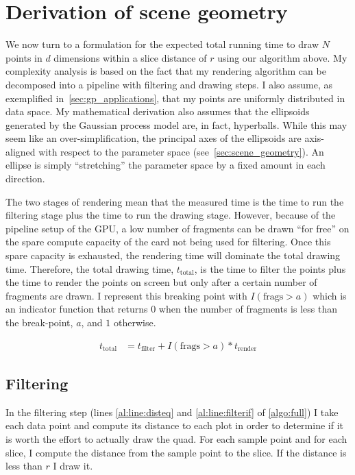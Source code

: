 \section{Derivation of scene geometry}
\label{sec:derivation}

We now turn to a formulation for the expected total running time to draw $N$
points in $d$ dimensions within a slice distance of $r$ using our algorithm 
above. My complexity
analysis is based on the fact that my rendering algorithm can be decomposed
into a pipeline with filtering and drawing steps. I also assume, as
exemplified in~\autoref{sec:gp_applications}, that my points are uniformly
distributed in data space.  My mathematical derivation also assumes that
the ellipsoids generated by the Gaussian process model are, in fact,
hyperballs. While this may seem like an over-simplification, the principal
axes of the ellipsoids are axis-aligned with respect to the parameter 
space (see~\autoref{sec:scene_geometry}).
An ellipse is simply ``stretching'' the parameter space
by a fixed amount in each direction.

The two stages of rendering mean that
the measured time is the time to run the
filtering stage plus the time to run the drawing stage.  However, because
of the pipeline setup of the GPU, a low number of fragments can be drawn
``for free'' on the spare compute capacity of the card not being used for filtering.
Once this spare capacity is exhausted, the rendering time will dominate the
total drawing time.
Therefore,
the total drawing time, $t_\text{total}$, is the time to filter the points
plus the time to render the points on screen but only after a certain 
number of fragments are drawn.  I represent this breaking point with
$I(\text{frags} > a)$ which is an indicator function that returns $0$ when
the number of fragments is less than the break-point, $a$, and $1$ otherwise.

\begin{align}
  t_\text{total} &= t_\text{filter} + I(\text{frags}>a) * t_\text{render}
  \label{eq:acttotal-H}
\end{align}

\subsection{Filtering}
\label{filtering}

In the filtering step (lines \autoref{al:line:disteq} and 
\autoref{al:line:filterif} of \autoref{algo:full}) I take each data
point and compute its distance to each plot in order to determine if it is
worth the effort to actually draw the quad. For each sample point and for each
slice, I compute the distance from the sample point to the slice. If the
distance is less than $r$ I draw it.

